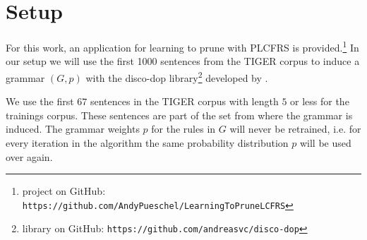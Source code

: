 \documentclass{tudscrartcl}
\theoremstyle{definition}
\begin{document}
\section{Setup}

For this work, an application for learning to prune with PLCFRS is provided.\footnote{project on GitHub: \texttt{https://github.com/AndyPueschel/LearningToPruneLCFRS}} In our setup we will use the first 1000 sentences from the TIGER corpus to induce a grammar $(G, p)$ with the disco-dop library\footnote{library on GitHub: \texttt{https://github.com/andreasvc/disco-dop}} developed by \cite{vancranenburgh16}.

We use the first $67$ sentences in the TIGER corpus with length $5$ or less for the trainings corpus. These sentences are part of the set from where the grammar is induced.
The grammar weights $p$ for the rules in $G$ will never be retrained, i.e. for every iteration in the  algorithm the same probability distribution $p$ will be used over again.
\end{document}
